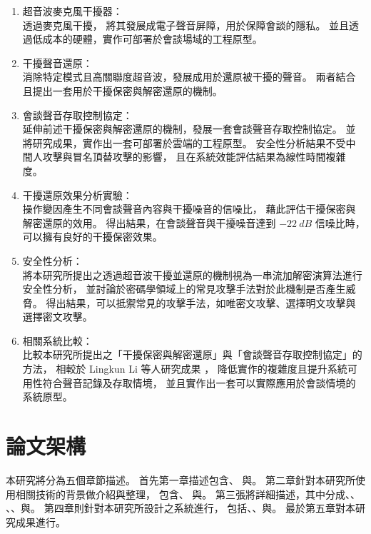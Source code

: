     \begin{enumerate}
        \item 超音波麥克風干擾器：\\
            透過麥克風干擾\cite{chen2020wearable}\cite{roy2017backdoor}，
        將其發展成電子聲音屏障，用於保障會談的隱私。
        並且透過低成本的硬體，實作可部署於會談場域的工程原型。

        \item 干擾聲音還原：\\
            消除特定模式且高關聯度超音波\cite{he2019canceling}，發展成用於還原被干擾的聲音。
        兩者結合且提出一套用於干擾保密與解密還原的機制。

        \item 會談聲音存取控制協定：\\
            延伸前述干擾保密與解密還原的機制，發展一套會談聲音存取控制協定。
        並將研究成果，實作出一套可部署於雲端的工程原型。
        安全性分析結果不受中間人攻擊與冒名頂替攻擊的影響，
        且在系統效能評估結果為線性時間複雜度。

        \item 干擾還原效果分析實驗：\\
            操作變因產生不同會談聲音內容與干擾噪音的信噪比，
        藉此評估干擾保密與解密還原的效用。
        得出結果，在會談聲音與干擾噪音達到 $-22~dB$ 信噪比時，可以擁有良好的干擾保密效果。

        \item 安全性分析：\\
            將本研究所提出之透過超音波干擾並還原的機制視為一串流加解密演算法進行安全性分析，
        並討論於密碼學領域上的常見攻擊手法對於此機制是否產生威脅。
        得出結果，可以抵禦常見的攻擊手法，如唯密文攻擊、選擇明文攻擊與選擇密文攻擊。

        \item 相關系統比較：\\
            比較本研究所提出之「干擾保密與解密還原」與「會談聲音存取控制協定」的方法，
        相較於 Lingkun Li 等人研究成果 \cite{li2020patronus}，
        降低實作的複雜度且提升系統可用性符合聲音記錄及存取情境，
        並且實作出一套可以實際應用於會談情境的系統原型。
    \end{enumerate}


\section{論文架構}\label{section:intro-arch}

    本研究將分為五個章節描述。
首先第一章描述包含、
與。
第二章針對本研究所使用相關技術的背景做介紹與整理，
包含、
與。
第三張將詳細描述，其中分成、、
、、與。
第四章則針對本研究所設計之系統進行，
包括、、與。
最於第五章對本研究成果進行。